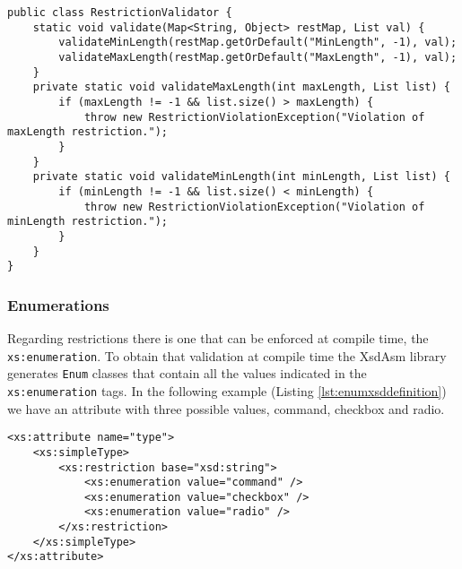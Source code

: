 \bigskip


\begin{minipage}{\linewidth}
\begin{lstlisting}[caption={Restriction Validator Class (Simplified)},label={lst:restrictionvalidator}]
public class RestrictionValidator {
    static void validate(Map<String, Object> restMap, List val) {
        validateMinLength(restMap.getOrDefault("MinLength", -1), val);
        validateMaxLength(restMap.getOrDefault("MaxLength", -1), val);
    }
    private static void validateMaxLength(int maxLength, List list) {
        if (maxLength != -1 && list.size() > maxLength) {
            throw new RestrictionViolationException("Violation of maxLength restriction.");
        }
    }
    private static void validateMinLength(int minLength, List list) {
        if (minLength != -1 && list.size() < minLength) {
            throw new RestrictionViolationException("Violation of minLength restriction.");
        }
    }
}
\end{lstlisting}
\end{minipage}

\subsubsection{Enumerations}
\label{sec:enumarations}

Regarding restrictions there is one that can be enforced at compile time, the \texttt{xs:enumeration}. To obtain that validation at compile time the XsdAsm library generates \texttt{Enum} classes that contain all the values indicated in the \texttt{xs:enumeration} tags. In the following example (Listing \ref{lst:enumxsddefinition}) we have an attribute with three possible values, command, checkbox and radio.

\bigskip


\begin{minipage}{\linewidth}
\begin{lstlisting}[caption={Enumeration XSD Definition},label={lst:enumxsddefinition}]
<xs:attribute name="type">
    <xs:simpleType>
        <xs:restriction base="xsd:string">
            <xs:enumeration value="command" />
            <xs:enumeration value="checkbox" />
            <xs:enumeration value="radio" />
        </xs:restriction>
    </xs:simpleType>
</xs:attribute>
\end{lstlisting}
\end{minipage}

